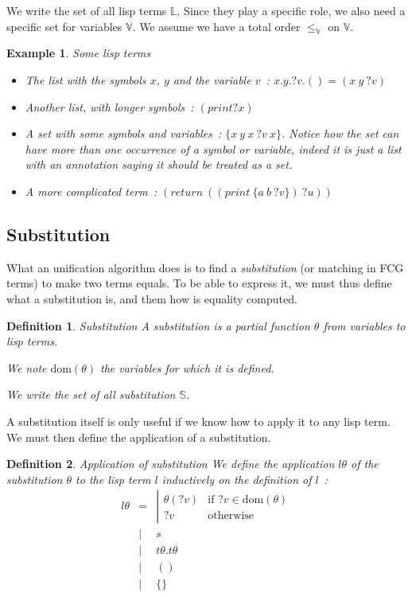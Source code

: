 \documentclass[]{article}
\newcommand{\1}{\mathbbm{1}}
\newcommand{\0}{\mathbbm{0}}
\newtheorem{defi}{Definition}
\newtheorem{ex}{Example}
\newcommand{\dom}{\text{dom}}
\begin{document}
We write the set of all lisp terms $\mathbb{L}$. Since they play a specific
role, we also need a specific set for variables $\mathbb{V}$. We assume we have
a total order $\leq_\mathbb{V}$ on $\mathbb{V}$.

\begin{ex}{Some lisp terms}\begin{itemize}
    \item The list with the symbols $x$, $y$ and the variable $v$~:
        $x.y.?v.() = (x\ y\ ?v)$
    \item Another list, with longer symbols~: $(print ?x)$
    \item A set with some symbols and variables~: $\{x\ y\ x\ ?v\ x\}$. Notice
        how the set can have more than one occurrence of a symbol or variable, indeed
        it is just a list with an annotation saying it should be treated as a set.
    \item A more complicated term~: $(return\ ((print\ \{a\ b\ ?v\})\ ?u))$
\end{itemize}\end{ex}

\subsection{Substitution}

What an unification algorithm does is to find a \emph{substitution} (or matching in
FCG terms) to make two terms equals. To be able to express it, we must thus define
what a substitution is, and them how is equality computed.

\begin{defi}{Substitution}
    A substitution is a partial function $\theta$ from variables to lisp terms.

    We note $\text{dom}(\theta)$ the variables for which it is defined.

    We write the set of all substitution $\mathbb{S}$.
\end{defi}

A substitution itself is only useful if we know how to apply it to any lisp
term. We must then define the application of a substitution.

\begin{defi}{Application of substitution}
    We define the application $l\theta$ of the substitution $\theta$ to the
    lisp term $l$ inductively on the definition of $l$~:
    \[\begin{array}{rcl}
        l\theta & = & \left|\begin{array}{ll}
                          \theta(?v) & \text{if } ?v\in\dom(\theta) \\
                          ?v         & \text{otherwise}
                      \end{array}\right. \\
                & | & s \\
                & | & t\theta.t\theta \\
                & | & () \\
                & | & \{\} \\
    \end{array}\]
\end{defi}
\end{document}
